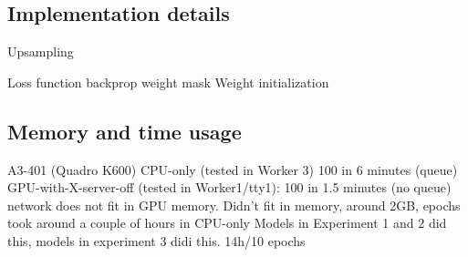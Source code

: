 
\subsection{Implementation details}
Upsampling

Loss function backprop weight mask
Weight initialization

\subsection{Memory and time usage}
A3-401 (Quadro K600)
CPU-only (tested in Worker 3) 100 in 6 minutes (queue)
GPU-with-X-server-off (tested in Worker1/tty1): 100 in 1.5 minutes (no queue)
network does not fit in GPU memory.
Didn't fit in memory, around 2GB, epochs took around a couple of hours in CPU-only
Models in Experiment 1 and 2 did this, models in experiment 3 didi this.
14h/10 epochs
